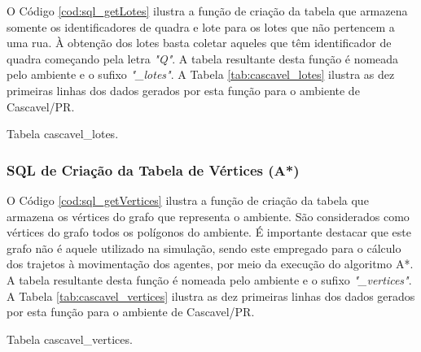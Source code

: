 O Código \ref{cod:sql_getLotes} ilustra a função de criação da tabela que armazena somente os identificadores de quadra e lote para os lotes que não pertencem a uma rua. À obtenção dos lotes basta coletar aqueles que têm identificador de quadra começando pela letra \textit{"Q"}. A tabela resultante desta função é nomeada pelo ambiente e o sufixo \textit{"\_lotes"}. A Tabela \ref{tab:cascavel_lotes} ilustra as dez primeiras linhas dos dados gerados por esta função para o ambiente de Cascavel/PR.



\begin{table}[H]
\centering
{}
\caption{Tabela cascavel\_lotes.}
\label{tab:cascavel_lotes}
\end{table}

\subsubsection{SQL de Criação da Tabela de Vértices (A*)}

O Código \ref{cod:sql_getVertices} ilustra a função de criação da tabela que armazena os vértices do grafo que representa o ambiente. São considerados como vértices do grafo todos os polígonos do ambiente. É importante destacar que este grafo não é aquele utilizado na simulação, sendo este empregado para o cálculo dos trajetos à movimentação dos agentes, por meio da execução do algoritmo A*. A tabela resultante desta função é nomeada pelo ambiente e o sufixo \textit{"\_vertices"}. A Tabela \ref{tab:cascavel_vertices} ilustra as dez primeiras linhas dos dados gerados por esta função para o ambiente de Cascavel/PR.



\begin{table}[H]
\centering
{}
\caption{Tabela cascavel\_vertices.}
\label{tab:cascavel_vertices}
\end{table}


